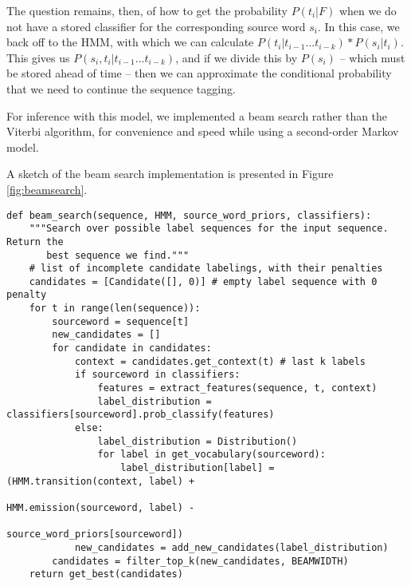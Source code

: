 \documentclass[11pt]{article}
\begin{document}
The question remains, then, of how to get the probability $P(t_i | F)$ when we
do not have a stored classifier for the corresponding source word $s_i$. In
this case, we back off to the HMM, with which we can calculate $P(t_i |
t_{i-1}...t_{i-k}) * P(s_i | t_i)$. This gives us $P(s_i, t_i |
t_{i-1}...t_{i-k})$, and if we divide this by $P(s_i)$ -- which must be stored
ahead of time -- then we can approximate the conditional probability that we
need to continue the sequence tagging.

For inference with this model, we implemented a beam search rather than the
Viterbi algorithm, for convenience and speed while using a second-order Markov
model.

A sketch of the beam search implementation is presented in Figure
\ref{fig:beamsearch}.

\begin{figure*}
\begin{lstlisting}[frame=none]
def beam_search(sequence, HMM, source_word_priors, classifiers):
    """Search over possible label sequences for the input sequence. Return the
       best sequence we find."""
    # list of incomplete candidate labelings, with their penalties
    candidates = [Candidate([], 0)] # empty label sequence with 0 penalty
    for t in range(len(sequence)):
        sourceword = sequence[t]
        new_candidates = []
        for candidate in candidates:
            context = candidates.get_context(t) # last k labels
            if sourceword in classifiers:
                features = extract_features(sequence, t, context)
                label_distribution = classifiers[sourceword].prob_classify(features)
            else:
                label_distribution = Distribution()
                for label in get_vocabulary(sourceword):
                    label_distribution[label] = (HMM.transition(context, label) +
                                                 HMM.emission(sourceword, label) -
                                                 source_word_priors[sourceword])
            new_candidates = add_new_candidates(label_distribution)
        candidates = filter_top_k(new_candidates, BEAMWIDTH)
    return get_best(candidates)

\end{lstlisting}
\caption{Python-style code sketch for combined MEMM/HMM beam search. We assume
that \texttt{prob\_classify} returns a mapping from labels to negative
log-probabilities, which we interpret as penalties to be minimized.
}
\label{fig:beamsearch}
\end{figure*}
\end{document}
